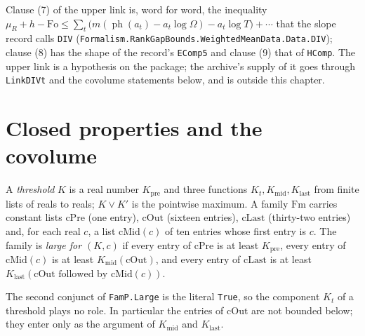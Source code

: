\begin{remark}
Clause (7) of the upper link is, word for word, the inequality
$\mu_R+h-\mathrm{Fo}\le\sum_t\bigl(m(\operatorname{ph}(a_t)-a_t\log\Omega)-a_t\log T\bigr)+\cdots$
that the slope record calls \texttt{DIV}
(\texttt{Formalism.RankGapBounds.WeightedMeanData.Data.DIV}); clause (8) has the
shape of the record's \texttt{EComp5} and clause (9) that of \texttt{HComp}.
The upper link is a hypothesis on the package; the archive's supply of it goes
through \texttt{LinkDIVt} and the covolume statements below, and is outside
this chapter.
\end{remark}

\section{Closed properties and the covolume}

\begin{definition}\label{geob:threshold}
A \emph{threshold} $K$ is a real number $K_{\mathrm{pre}}$ and three functions
$K_t,K_{\mathrm{mid}},K_{\mathrm{last}}$ from finite lists of reals to reals;
$K\vee K'$ is the pointwise maximum. A family $\mathrm{Fm}$ carries constant
lists $\mathrm{cPre}$ (one entry), $\mathrm{cOut}$ (sixteen entries),
$\mathrm{cLast}$ (thirty-two entries) and, for each real $c$, a list
$\mathrm{cMid}(c)$ of ten entries whose first entry is $c$. The family is
\emph{large for $(K,c)$} if every entry of $\mathrm{cPre}$ is at least
$K_{\mathrm{pre}}$, every entry of $\mathrm{cMid}(c)$ is at least
$K_{\mathrm{mid}}(\mathrm{cOut})$, and every entry of $\mathrm{cLast}$ is at
least $K_{\mathrm{last}}(\mathrm{cOut}\text{ followed by }\mathrm{cMid}(c))$.
\end{definition}

\begin{remark}
The second conjunct of \texttt{FamP.Large} is the literal \texttt{True}, so
the component $K_t$ of a threshold plays no role. In particular the entries
of $\mathrm{cOut}$ are not bounded below; they enter only as the argument of
$K_{\mathrm{mid}}$ and $K_{\mathrm{last}}$.
\end{remark}

